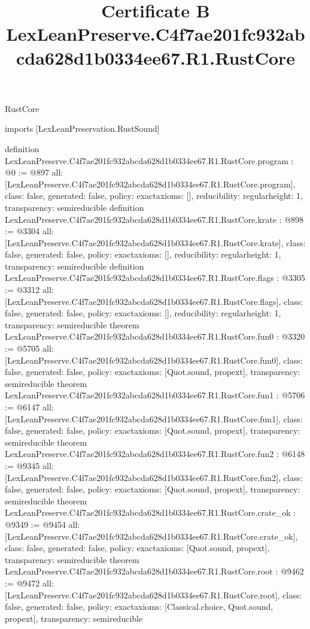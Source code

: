 \begin{lexlean}{RustCore}
\title{Certificate B LexLeanPreserve.C4f7ae201fc932abcda628d1b0334ee67.R1.RustCore}
\begin{coremodule}
imports [LexLeanPreservation.RustSound]

definition LexLeanPreserve.C4f7ae201fc932abcda628d1b0334ee67.R1.RustCore.program : @0 := @897 {
  all: [LexLeanPreserve.C4f7ae201fc932abcda628d1b0334ee67.R1.RustCore.program],
  class: false,
  generated: false,
  policy: exact{axioms: []},
  reducibility: regular{height: 1},
  transparency: semireducible
}
definition LexLeanPreserve.C4f7ae201fc932abcda628d1b0334ee67.R1.RustCore.krate : @898 := @3304 {
  all: [LexLeanPreserve.C4f7ae201fc932abcda628d1b0334ee67.R1.RustCore.krate],
  class: false,
  generated: false,
  policy: exact{axioms: []},
  reducibility: regular{height: 1},
  transparency: semireducible
}
definition LexLeanPreserve.C4f7ae201fc932abcda628d1b0334ee67.R1.RustCore.flags : @3305 := @3312 {
  all: [LexLeanPreserve.C4f7ae201fc932abcda628d1b0334ee67.R1.RustCore.flags],
  class: false,
  generated: false,
  policy: exact{axioms: []},
  reducibility: regular{height: 1},
  transparency: semireducible
}
theorem LexLeanPreserve.C4f7ae201fc932abcda628d1b0334ee67.R1.RustCore.fun0 : @3320 := @5705 {
  all: [LexLeanPreserve.C4f7ae201fc932abcda628d1b0334ee67.R1.RustCore.fun0],
  class: false,
  generated: false,
  policy: exact{axioms: [Quot.sound, propext]},
  transparency: semireducible
}
theorem LexLeanPreserve.C4f7ae201fc932abcda628d1b0334ee67.R1.RustCore.fun1 : @5706 := @6147 {
  all: [LexLeanPreserve.C4f7ae201fc932abcda628d1b0334ee67.R1.RustCore.fun1],
  class: false,
  generated: false,
  policy: exact{axioms: [Quot.sound, propext]},
  transparency: semireducible
}
theorem LexLeanPreserve.C4f7ae201fc932abcda628d1b0334ee67.R1.RustCore.fun2 : @6148 := @9345 {
  all: [LexLeanPreserve.C4f7ae201fc932abcda628d1b0334ee67.R1.RustCore.fun2],
  class: false,
  generated: false,
  policy: exact{axioms: [Quot.sound, propext]},
  transparency: semireducible
}
theorem LexLeanPreserve.C4f7ae201fc932abcda628d1b0334ee67.R1.RustCore.crate_ok : @9349 := @9454 {
  all: [LexLeanPreserve.C4f7ae201fc932abcda628d1b0334ee67.R1.RustCore.crate_ok],
  class: false,
  generated: false,
  policy: exact{axioms: [Quot.sound, propext]},
  transparency: semireducible
}
theorem LexLeanPreserve.C4f7ae201fc932abcda628d1b0334ee67.R1.RustCore.root : @9462 := @9472 {
  all: [LexLeanPreserve.C4f7ae201fc932abcda628d1b0334ee67.R1.RustCore.root],
  class: false,
  generated: false,
  policy: exact{axioms: [Classical.choice, Quot.sound, propext]},
  transparency: semireducible
}


\end{coremodule}
\end{lexlean}
